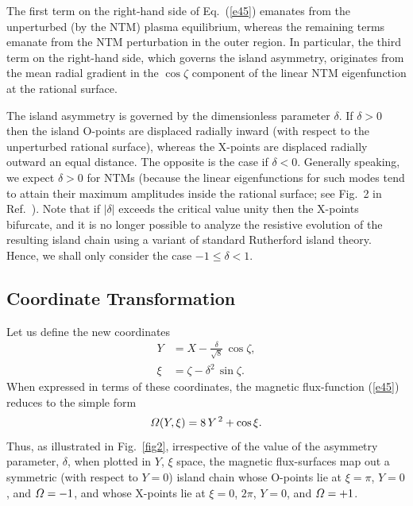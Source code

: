 \documentclass[12pt,prb,aps]{revtex4-1}
\begin{document}
The first term on the right-hand side of Eq.~(\ref{e45}) emanates from the unperturbed (by the NTM) plasma equilibrium, whereas the
remaining terms emanate from the NTM perturbation in the outer region. In particular, the third term on the right-hand
side, which governs the island asymmetry,  originates from  the mean radial gradient in the $\cos\zeta$ component of the linear NTM eigenfunction at the rational surface. 

The island asymmetry is governed by the dimensionless parameter $\delta$. If $\delta >0$ then the island O-points are displaced radially inward (with respect to the unperturbed rational
surface), whereas the X-points are displaced radially outward an equal distance. The opposite is the case if $\delta <0$. Generally speaking,  we
expect $\delta>0$ for NTMs (because the linear eigenfunctions for such modes tend to attain their
maximum amplitudes inside the rational surface; see Fig.~2 in Ref.~). Note that if  $|\delta|$ exceeds the critical value
unity then the X-points bifurcate, and it is no longer possible to analyze the resistive evolution of the  resulting island chain  using a variant of standard Rutherford island theory.\cite{ntm1} Hence, we shall only consider the case $-1\leq \delta < 1$. 

\subsection{Coordinate Transformation}
Let us define the new coordinates\,\cite{island}
\begin{align}
Y &= X-\frac{\delta}{\sqrt{8}}\,\cos\zeta,\label{ek}\\[0.5ex]
\xi&=\zeta-\delta^2\,\sin\zeta.\label{ekepler}
\end{align}
When expressed in terms of these coordinates, the magnetic flux-function (\ref{e45}) reduces to the simple
form
\begin{equation}\label{eeven}
{\mit\Omega}(Y,\xi) =8\,Y^{\,2}+\cos\xi.
\end{equation}
Thus, as illustrated in Fig.~\ref{fig2}, irrespective of the value of the asymmetry parameter, $\delta$, when
plotted in $Y$, $\xi$ space, the magnetic flux-surfaces map out a symmetric (with respect to $Y=0$) island
chain whose O-points lie at $\xi=\pi$, $Y=0$,
and ${\mit\Omega}=-1$, and whose X-points lie at $\xi=0$, $2\pi$, $Y=0$, and ${\mit\Omega}=+1$.  
\end{document}
